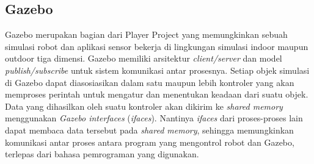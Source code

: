 \subsection{Gazebo}
\label{subsec:gazebo}

Gazebo \citep{koenig2004} merupakan bagian dari Player Project \citep{gerkey2003} yang memungkinkan sebuah simulasi robot dan aplikasi sensor bekerja di lingkungan simulasi indoor maupun outdoor tiga dimensi.
Gazebo memiliki arsitektur \emph{client/server} dan model \emph{publish/subscribe} untuk sistem komunikasi antar prosesnya.
Setiap objek simulasi di Gazebo dapat diasosiasikan dalam satu maupun lebih kontroler yang akan memproses perintah untuk mengatur dan menentukan keadaan dari suatu objek.
Data yang dihasilkan oleh suatu kontroler akan dikirim ke \emph{shared memory} menggunakan \emph{Gazebo interfaces} (\emph{ifaces}).
Nantinya \emph{ifaces} dari proses-proses lain dapat membaca data tersebut pada \emph{shared memory},
  sehingga memungkinkan komunikasi antar proses antara program yang mengontrol robot dan Gazebo,
  terlepas dari bahasa pemrograman yang digunakan.
